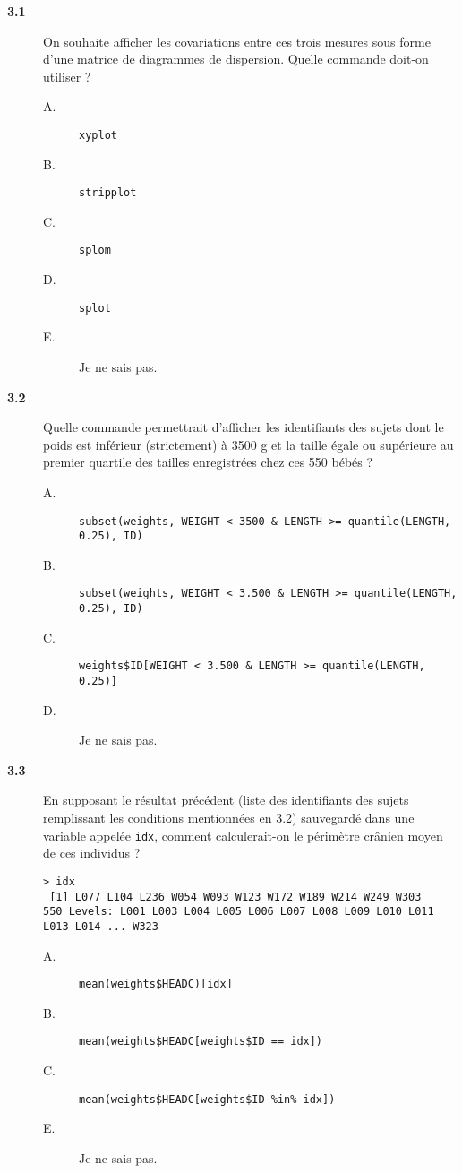 \documentclass[11pt]{report}
\theoremstyle{definition}
\begin{document}
\begin{description}
\item[\bf 3.1]  On souhaite afficher les
  covariations entre ces trois mesures sous forme d'une matrice de
  diagrammes de dispersion. Quelle commande doit-on utiliser ?
  \begin{description}
  \item[A.] \verb|xyplot|
  \item[B.] \verb|stripplot|
  \item[C.] \verb|splom|
  \item[D.] \verb|splot|
  \item[E.] Je ne sais pas.
  \end{description}  
\item[\bf 3.2]  Quelle commande permettrait
  d'afficher les identifiants des sujets dont le poids est inférieur
  (strictement) à 3500 g et la taille égale ou supérieure au premier
  quartile des tailles enregistrées chez ces 550 bébés ?
  \begin{description}
  \item[A.] \verb|subset(weights, WEIGHT < 3500 & LENGTH >= quantile(LENGTH, 0.25), ID)|
  \item[B.] \verb|subset(weights, WEIGHT < 3.500 & LENGTH >= quantile(LENGTH, 0.25), ID)|
  \item[C.] \verb|weights$ID[WEIGHT < 3.500 & LENGTH >= quantile(LENGTH, 0.25)]|
  \item[D.] Je ne sais pas.
  \end{description}  
\item[\bf 3.3]  En supposant le résultat précédent
  (liste des identifiants des sujets remplissant les conditions mentionnées
  en 3.2) sauvegardé dans une variable appelée \texttt{idx}, comment
  calculerait-on le périmètre crânien moyen de ces individus ?
\begin{verbatim}
> idx
 [1] L077 L104 L236 W054 W093 W123 W172 W189 W214 W249 W303
550 Levels: L001 L003 L004 L005 L006 L007 L008 L009 L010 L011 L013 L014 ... W323
\end{verbatim}
  \begin{description}
  \item[A.] \verb|mean(weights$HEADC)[idx]|
  \item[B.] \verb|mean(weights$HEADC[weights$ID == idx])|
  \item[C.] \verb|mean(weights$HEADC[weights$ID %in% idx])|
  \item[E.] Je ne sais pas.

\end{description}
\end{description}
\end{document}
